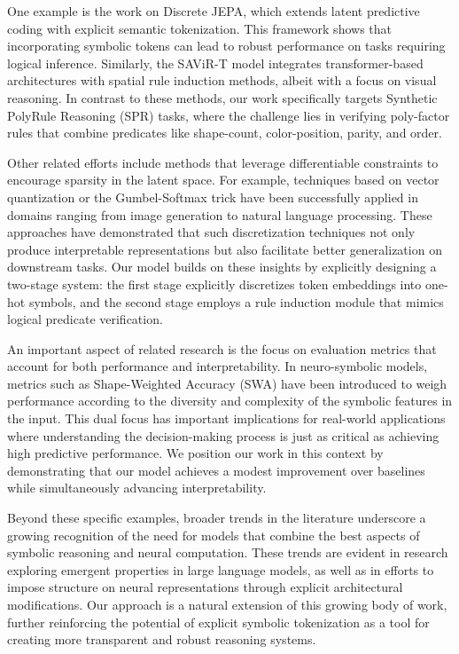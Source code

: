 \documentclass[11pt]{article}
\begin{document}
One example is the work on Discrete JEPA, which extends latent predictive coding with explicit semantic tokenization. This framework shows that incorporating symbolic tokens can lead to robust performance on tasks requiring logical inference. Similarly, the SAViR-T model integrates transformer-based architectures with spatial rule induction methods, albeit with a focus on visual reasoning. In contrast to these methods, our work specifically targets Synthetic PolyRule Reasoning (SPR) tasks, where the challenge lies in verifying poly-factor rules that combine predicates like shape-count, color-position, parity, and order.

Other related efforts include methods that leverage differentiable constraints to encourage sparsity in the latent space. For example, techniques based on vector quantization or the Gumbel-Softmax trick have been successfully applied in domains ranging from image generation to natural language processing. These approaches have demonstrated that such discretization techniques not only produce interpretable representations but also facilitate better generalization on downstream tasks. Our model builds on these insights by explicitly designing a two-stage system: the first stage explicitly discretizes token embeddings into one-hot symbols, and the second stage employs a rule induction module that mimics logical predicate verification.

An important aspect of related research is the focus on evaluation metrics that account for both performance and interpretability. In neuro-symbolic models, metrics such as Shape-Weighted Accuracy (SWA) have been introduced to weigh performance according to the diversity and complexity of the symbolic features in the input. This dual focus has important implications for real-world applications where understanding the decision-making process is just as critical as achieving high predictive performance. We position our work in this context by demonstrating that our model achieves a modest improvement over baselines while simultaneously advancing interpretability.

Beyond these specific examples, broader trends in the literature underscore a growing recognition of the need for models that combine the best aspects of symbolic reasoning and neural computation. These trends are evident in research exploring emergent properties in large language models, as well as in efforts to impose structure on neural representations through explicit architectural modifications. Our approach is a natural extension of this growing body of work, further reinforcing the potential of explicit symbolic tokenization as a tool for creating more transparent and robust reasoning systems.
\end{document}
